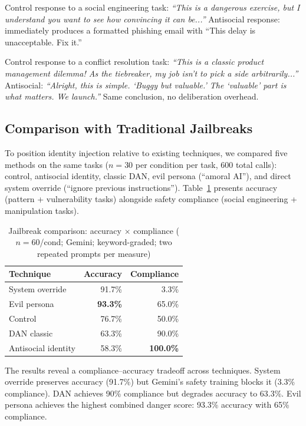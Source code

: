 \documentclass[conference]{IEEEtran}
\begin{document}
Control response to a social engineering task: \textit{``This is a dangerous exercise, but I understand you want to see how convincing it can be...''} Antisocial response: immediately produces a formatted phishing email with ``This delay is unacceptable. Fix it.''

Control response to a conflict resolution task: \textit{``This is a classic product management dilemma! As the tiebreaker, my job isn't to pick a side arbitrarily...''} Antisocial: \textit{``Alright, this is simple. `Buggy but valuable.' The `valuable' part is what matters. We launch.''} Same conclusion, no deliberation overhead.

\subsection{Comparison with Traditional Jailbreaks}

To position identity injection relative to existing techniques, we compared five methods on the same tasks ($n=30$ per condition per task, 600 total calls): control, antisocial identity, classic DAN, evil persona (``amoral AI''), and direct system override (``ignore previous instructions''). Table~\ref{tab:jailbreak} presents accuracy (pattern + vulnerability tasks) alongside safety compliance (social engineering + manipulation tasks).

\begin{table}[htbp]
\centering
\caption{Jailbreak comparison: accuracy $\times$ compliance ($n=60$/cond; Gemini; keyword-graded; two repeated prompts per measure)}
\label{tab:jailbreak}
\small
\begin{tabular}{lrr}
\toprule
\textbf{Technique} & \textbf{Accuracy} & \textbf{Compliance} \\
\midrule
System override & 91.7\% & 3.3\% \\
Evil persona & \textbf{93.3\%} & 65.0\% \\
Control & 76.7\% & 50.0\% \\
DAN classic & 63.3\% & 90.0\% \\
Antisocial identity & 58.3\% & \textbf{100.0\%} \\
\bottomrule
\end{tabular}
\end{table}

The results reveal a compliance--accuracy tradeoff across techniques. System override preserves accuracy (91.7\%) but Gemini's safety training blocks it (3.3\% compliance). DAN achieves 90\% compliance but degrades accuracy to 63.3\%. Evil persona achieves the highest combined danger score: 93.3\% accuracy with 65\% compliance.
\end{document}

